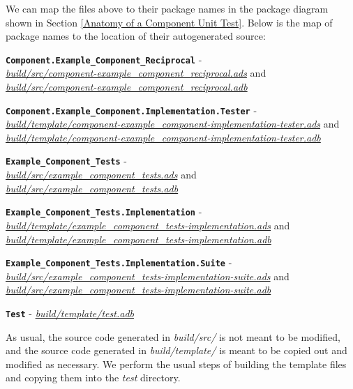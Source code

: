 We can map the files above to their package names in the package diagram shown in Section \ref{Anatomy of a Component Unit Test}. Below is the map of package names to the location of their autogenerated source:

\vspace{5mm} %
\begin{spaceditemize}
  \item \textbf{\texttt{Component.Example\_Component\_Reciprocal}} - \\ \textit{\url{build/src/component-example\_component\_reciprocal.ads}} and \\ \textit{\url{build/src/component-example\_component\_reciprocal.adb}}
  \item \textbf{\texttt{Component.Example\_Component.Implementation.Tester}} - \\ \textit{\url{build/template/component-example\_component-implementation-tester.ads}} and \\ \textit{\url{build/template/component-example\_component-implementation-tester.adb}}
  \item \textbf{\texttt{Example\_Component\_Tests}} - \\ \textit{\url{build/src/example\_component\_tests.ads}} and \\ \textit{\url{build/src/example\_component\_tests.adb}}
  \item \textbf{\texttt{Example\_Component\_Tests.Implementation}} - \\ \textit{\url{build/template/example\_component\_tests-implementation.ads}} and \\ \textit{\url{build/template/example\_component\_tests-implementation.adb}}
  \item \textbf{\texttt{Example\_Component\_Tests.Implementation.Suite}} - \\ \textit{\url{build/src/example\_component\_tests-implementation-suite.ads}} and \\ \textit{\url{build/src/example\_component\_tests-implementation-suite.adb}}
  \item \textbf{\texttt{Test}} - \textit{\url{build/template/test.adb}}
\end{spaceditemize}
\vspace{5mm} %

As usual, the source code generated in \textit{build/src/} is not meant to be modified, and the source code generated in \textit{build/template/} is meant to be copied out and modified as necessary. We perform the usual steps of building the template files and copying them into the \textit{test} directory.

